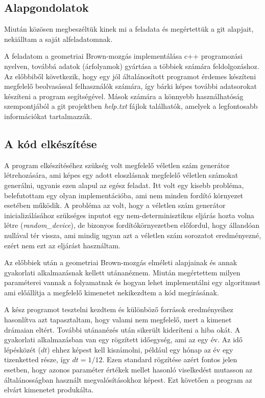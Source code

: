 \documentclass[a4paper, 12pt]{article}
\numberwithin{equation}{section}          %
\numberwithin{figure}{subsection}
\begin{document}
		\subsection{Alapgondolatok}
	
		Miután közösen megbeszéltük kinek mi a feladata és megértettük a git alapjait,
		nekiálltam a saját alfeladatomnak.
		
		A feladatom a geometriai Brown-mozgás implementálása c++ programozási nyelven,
		továbbá adatok (árfolyamok) gyártása a többiek számára feldolgozáshoz.
		Az előbbiből következik, hogy egy jól általánosított programot érdemes készíteni
		megfelelő beolvasással felhasználók számára, így bárki képes további adatsorokat készíteni
		a program segítségével. Mások számára a könnyebb használhatóság szempontjából a
		git projektben \textit{help.txt} fájlok találhatók, amelyek a legfontosabb információkat
		tartalmazzák.
		
		\subsection{A kód elkészítése}
		
		A program elkészítéséhez szükség volt megfelelő véletlen szám generátor létrehozására,
		ami képes egy adott eloszlásnak megfelelő véletlen számokat generálni, ugyanis ezen alapul
		az egész feladat. Itt volt egy kisebb probléma, belefutottam egy olyan implementációba,
		ami nem minden fordító környezet esetében működik. A probléma az volt, hogy a véletlen
		szám generátor inicializálásához szükséges inputot egy nem-determinisztikus eljárás
		hozta volna létre (\textit{random\_device}), de bizonyos fordítókörnyezetben előfordul,
		hogy állandóan nullával tér vissza, ami mindig ugyan azt a véletlen szám sorozatot
		eredményezné, ezért nem ezt az eljárást használtam.
		
		Az előbbiek után a geometriai Brown-mozgás elméleti alapjainak és annak gyakorlati
		alkalmazásnak kellett utánanéznem. Miután megértettem milyen paraméterei vannak
		a folyamatnak és hogyan lehet implementálni egy algoritmust ami előállítja a megfelelő
		kimenetet nekikezdtem a kód megírásának.
		
		A kész programot tesztelni kezdtem és különböző források eredményeihez hasonlítva
		azt tapasztaltam, hogy valami nem megfelelő, mert a kimenet drámaian eltért.
		További utánanézés után sikerült kideríteni a hiba okát. A gyakorlati alkalmazásban
		van egy rögzített időegység, ami az egy év. Az idő lépésközét ($dt$) ehhez képest kell
		kiszámolni, például egy hónap az év egy tizenketted része, így $dt = 1/12$.
		Ezen standard rögzítése azért fontos jelen esetben, hogy azonos paraméter értékek
		mellet hasonló viselkedést mutasson az általánosságban használt megvalósításokhoz
		képest. Ezt követően a program az elvárt kimenetet produkálta.
		
\end{document}
